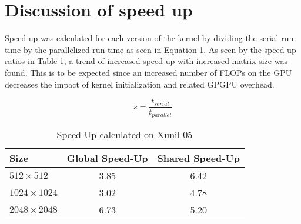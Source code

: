 \documentclass[12pt]{article}
\begin{document}
\pagebreak
\vspace{-0.6cm}
\section{Discussion of speed up}
\vspace{-0.4cm}

\qquad Speed-up was calculated for each version of the kernel by dividing the 
serial run-time by the parallelized run-time as seen in Equation 1. 
As seen by the speed-up ratios in Table 1, a trend of increased speed-up
with increased matrix size was found. This is to be expected since
an increased number of FLOPs on the GPU decreases the impact of kernel initialization
and related GPGPU overhead.

\begin{equation}
    s = \frac{t_{serial}}{t_{parallel}}\label{eq1}
\end{equation}

\begin{table}[H]
\centering
\begin{tabular}{@{}|l|c|c|}
\hline
Size & Global Speed-Up & Shared Speed-Up\\ \hline
$512\times 512$    & 3.85 & 6.42 \\ \hline 
$1024\times 1024$  & 3.02 & 4.78 \\ \hline 
$2048\times 2048$  & 6.73 & 5.20 \\ \hline 
\end{tabular}
\caption{Speed-Up calculated on Xunil-05}
\end{table}
\end{document}

